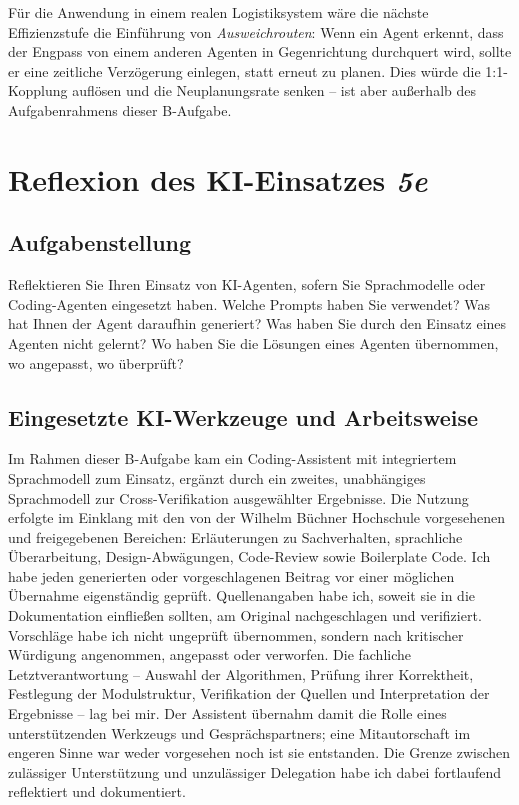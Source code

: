 Für die Anwendung in einem realen Logistiksystem wäre die nächste Effizienzstufe die Einführung von \textit{Ausweichrouten}: Wenn ein Agent erkennt, dass der Engpass von einem anderen Agenten in Gegenrichtung durchquert wird, sollte er eine zeitliche Verzögerung einlegen, statt erneut zu planen. Dies würde die 1:1-Kopplung auflösen und die Neuplanungsrate senken -- ist aber außerhalb des Aufgabenrahmens dieser B-Aufgabe.


\section{Reflexion des \acs{KI}-Einsatzes \textit{5e}}
\label{sec:aufgabe5e}

\subsection{Aufgabenstellung}

Reflektieren Sie Ihren Einsatz von \acs{KI}-Agenten, sofern Sie Sprachmodelle oder Coding-Agenten eingesetzt haben. Welche Prompts haben Sie verwendet? Was hat Ihnen der Agent daraufhin generiert? Was haben Sie durch den Einsatz eines Agenten nicht gelernt? Wo haben Sie die Lösungen eines Agenten übernommen, wo angepasst, wo überprüft?

\subsection{Eingesetzte \acs{KI}-Werkzeuge und Arbeitsweise}

Im Rahmen dieser B-Aufgabe kam ein Coding-Assistent mit integriertem Sprachmodell zum Einsatz, ergänzt durch ein zweites, unabhängiges Sprachmodell zur Cross-Verifikation ausgewählter Ergebnisse. Die Nutzung erfolgte im Einklang mit den von der Wilhelm Büchner Hochschule vorgesehenen und freigegebenen Bereichen: Erläuterungen zu Sachverhalten, sprachliche Überarbeitung, Design-Abwägungen, Code-Review sowie Boilerplate Code. Ich habe jeden generierten oder vorgeschlagenen Beitrag vor einer möglichen Übernahme eigenständig geprüft. Quellenangaben habe ich, soweit sie in die Dokumentation einfließen sollten, am Original nachgeschlagen und verifiziert. Vorschläge habe ich nicht ungeprüft übernommen, sondern nach kritischer Würdigung angenommen, angepasst oder verworfen. Die fachliche Letztverantwortung – Auswahl der Algorithmen, Prüfung ihrer Korrektheit, Festlegung der Modulstruktur, Verifikation der Quellen und Interpretation der Ergebnisse – lag bei mir. Der Assistent übernahm damit die Rolle eines unterstützenden Werkzeugs und Gesprächspartners; eine Mitautorschaft im engeren Sinne war weder vorgesehen noch ist sie entstanden. Die Grenze zwischen zulässiger Unterstützung und unzulässiger Delegation habe ich dabei fortlaufend reflektiert und dokumentiert.

